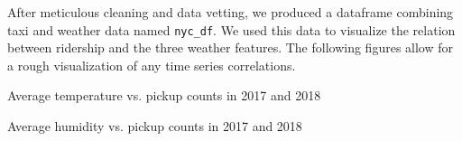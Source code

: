 \documentclass[journal, 12pt]{IEEEtran}
\newcommand{\cc}[1]{\texttt{#1}}
\begin{document}
\noindent After meticulous cleaning and data vetting, we produced a dataframe combining taxi and weather data named \cc{nyc\_df}. We used this data to visualize the relation between ridership and the three weather features. The following figures allow for a rough visualization of any time series correlations. \\

\begingroup
    \centering
    \medskip
    \qquad
    \caption{Average temperature vs. pickup counts in 2017 and 2018}%
    \label{fig:curves}%
    \medskip
\endgroup



\begingroup
    \centering
    \medskip
    \qquad
    \caption{Average humidity vs. pickup counts in 2017 and 2018}%
    \label{fig:curves}%
    \medskip
\endgroup
\end{document}
